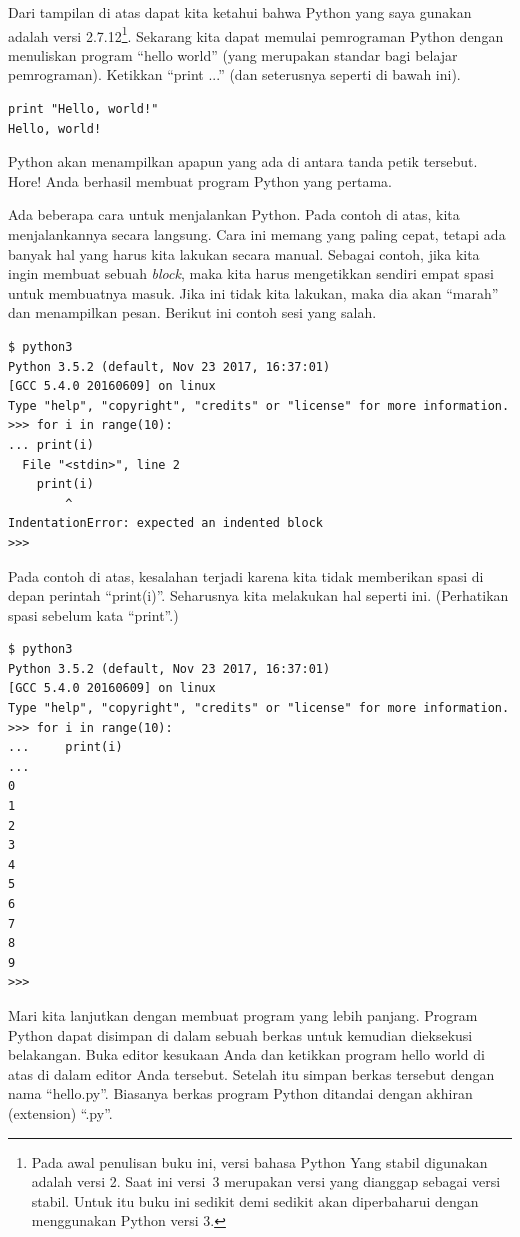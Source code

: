 Dari tampilan di atas dapat kita ketahui bahwa Python yang saya gunakan adalah
versi 2.7.12\footnote{Pada awal penulisan buku ini, versi bahasa Python Yang
stabil digunakan adalah versi 2. Saat ini versi~3 merupakan versi yang dianggap
sebagai versi stabil. Untuk itu buku ini sedikit demi sedikit akan diperbaharui
dengan menggunakan Python versi 3.}. 
Sekarang kita dapat memulai pemrograman Python dengan menuliskan
program ``hello world'' (yang merupakan standar bagi belajar pemrograman).
Ketikkan ``print ...'' (dan seterusnya seperti di bawah ini).

\begin{verbatim}
print "Hello, world!"
Hello, world!
\end{verbatim}

Python akan menampilkan apapun yang ada di antara tanda petik tersebut. Hore!
Anda berhasil membuat program Python yang pertama.

Ada beberapa cara untuk menjalankan Python. Pada contoh di atas, kita
menjalankannya secara langsung. Cara ini memang yang paling cepat, tetapi ada
banyak hal yang harus kita lakukan secara manual. Sebagai contoh, jika kita
ingin membuat sebuah {\em block}, maka kita harus mengetikkan sendiri empat
spasi untuk membuatnya masuk. Jika ini tidak kita lakukan, maka dia akan
``marah'' dan menampilkan pesan. Berikut ini contoh sesi yang salah.

\begin{verbatim}
$ python3
Python 3.5.2 (default, Nov 23 2017, 16:37:01) 
[GCC 5.4.0 20160609] on linux
Type "help", "copyright", "credits" or "license" for more information.
>>> for i in range(10):
... print(i)
  File "<stdin>", line 2
    print(i)
        ^
IndentationError: expected an indented block
>>> 
\end{verbatim}

Pada contoh di atas, kesalahan terjadi karena kita tidak memberikan spasi di
depan perintah ``print(i)''. Seharusnya kita melakukan hal seperti ini.
(Perhatikan spasi sebelum kata ``print''.)

\begin{verbatim}
$ python3
Python 3.5.2 (default, Nov 23 2017, 16:37:01) 
[GCC 5.4.0 20160609] on linux
Type "help", "copyright", "credits" or "license" for more information.
>>> for i in range(10):
...     print(i)
... 
0
1
2
3
4
5
6
7
8
9
>>> 
\end{verbatim}


Mari kita lanjutkan dengan membuat program yang lebih panjang. Program Python
dapat disimpan di dalam sebuah berkas untuk kemudian dieksekusi belakangan.
Buka editor kesukaan Anda dan ketikkan program hello world di atas di dalam
editor Anda tersebut. Setelah itu simpan berkas tersebut dengan nama
``hello.py''. Biasanya berkas program Python ditandai dengan akhiran
(extension) ``.py''.

